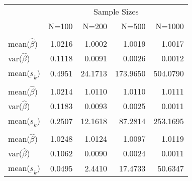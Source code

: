 
\begin{tabular}{lrrrr}
\toprule
\multicolumn{1}{c}{ } & \multicolumn{4}{c}{Sample Sizes} \\
\cmidrule(l{3pt}r{3pt}){2-5}
  & N=100 & N=200 & N=500 & N=1000\\
\midrule
\addlinespace[0.3em]
\multicolumn{5}{l}{\textbf{$ \rho = 0 $  }}\\
\hspace{1em}mean($\hat{\beta}$) & 1.0216 & 1.0002 & 1.0019 & 1.0017\\
\hspace{1em}var($\hat{\beta}$) & 0.1118 & 0.0091 & 0.0026 & 0.0012\\
\hspace{1em}mean($\underbar{s}_k$) & 0.4951 & 24.1713 & 173.9650 & 504.0790\\
\addlinespace[0.3em]
\multicolumn{5}{l}{\textbf{$ \rho = 0.5 $}}\\
\hspace{1em}mean($\hat{\beta}$) & 1.0214 & 1.0110 & 1.0110 & 1.0111\\
\hspace{1em}var($\hat{\beta}$) & 0.1183 & 0.0093 & 0.0025 & 0.0011\\
\hspace{1em}mean($\underbar{s}_k$) & 0.2507 & 12.1618 & 87.2814 & 253.1695\\
\addlinespace[0.3em]
\multicolumn{5}{l}{\textbf{$ \rho = 0.9 $}}\\
\hspace{1em}mean($\hat{\beta}$) & 1.0248 & 1.0124 & 1.0097 & 1.0119\\
\hspace{1em}var($\hat{\beta}$) & 0.1062 & 0.0090 & 0.0024 & 0.0011\\
\hspace{1em}mean($\underbar{s}_k$) & 0.0495 & 2.4410 & 17.4733 & 50.6347\\
\bottomrule
\end{tabular}
